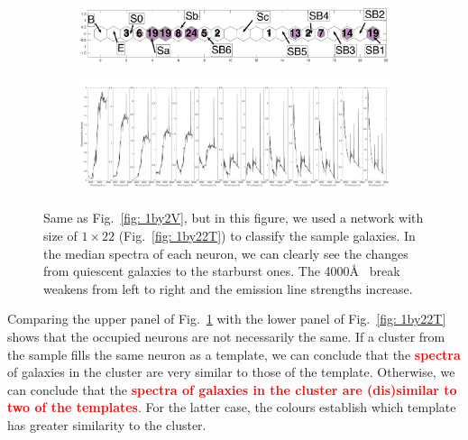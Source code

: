             \begin{figure}
                \begin{subfigure}[b]{\textwidth}
                    \includegraphics[width=\textwidth]{images0.01/1d/hit_v_1_by_22_n.png}
                    \centering
                \end{subfigure}
                \hfill
                \begin{subfigure}[b]{\textwidth}
                \centering
                     \includegraphics[width=\textwidth]{images0.01/1d/SED_total1by22_fluxdensity.png}
                \end{subfigure}
                \caption[Classification of fitted galaxy SEDs from \citet{Hossein12} using the $1\times22$~networks]{Same as Fig.~\ref{fig: 1by2V}, but in this figure, we used a network with size of $1\times22$ (Fig.~\ref{fig: 1by22T}) to classify the sample galaxies. In the median spectra of each neuron, we can clearly see the changes from quiescent galaxies to the starburst ones. The 4000\AA~ break weakens from left to right and the emission line strengths increase.}
                \label{fig: 1by22V}
            \end{figure}
            
            Comparing the upper panel of Fig.~\ref{fig: 1by22V} with the lower panel of Fig.~\ref{fig: 1by22T} shows that the occupied neurons are not necessarily the same.
            If a cluster from the  sample fills the same neuron as a  template, we can conclude that the \textbf{\textcolor{red}{spectra}} of galaxies in the cluster are very similar to those of the template.
            Otherwise, we can conclude that the \textbf{\textcolor{red}{spectra of galaxies in the cluster are (dis)similar to two of the  templates}}.
            For the latter case, the colours establish which template has greater similarity to the  cluster.
            
